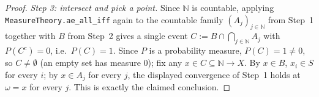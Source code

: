 \begin{proof}
  \emph{Step 3: intersect and pick a point.} Since $\mathbb{N}$ is countable, applying
  \texttt{MeasureTheory.ae\_all\_iff} again to the countable family $(A_j)_{j \in \mathbb{N}}$ from
  Step~1 together with $B$ from Step~2 gives a single event
  $C := B \cap \bigcap_{j\in\mathbb{N}} A_j$ with $P(C^c) = 0$, i.e.\ $P(C) = 1$. Since $P$ is a
  probability measure, $P(C) = 1 \ne 0$, so $C \ne \emptyset$ (an empty set has measure $0$); fix any
  $x \in C \subseteq \mathbb{N} \to X$. By $x \in B$, $x_i \in S$ for every $i$; by $x \in A_j$ for
  every $j$, the displayed convergence of Step~1 holds at $\omega = x$ for every $j$. This is exactly
  the claimed conclusion.
\end{proof}
